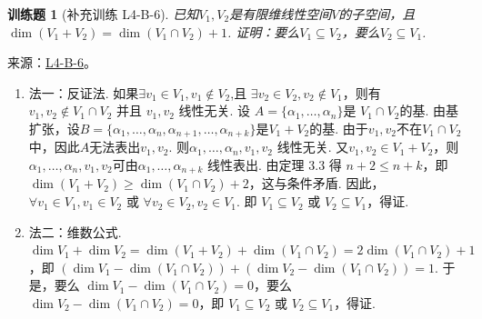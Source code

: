 \documentclass[12pt,fontset=fandol]{ctexart}
\newtheorem{exercise}{训练题}[section]
\begin{document}
\begin{exercise}[补充训练 L4-B-6]\label{prob:L4-B-6}
已知$V_1,V_2$是有限维线性空间$V$的子空间，且$\dim(V_1+V_2)=\dim(V_1 \cap V_2)+1$. 证明：要么$V_1 \subseteq V_2$，要么$V_2 \subseteq V_1$.
\end{exercise}
\noindent 来源：\href{https://github.com/yhwu-is/Linear-Algebra-Left-Undone/blob/new/%E8%AE%B2%E4%B9%89/%E4%B8%93%E9%A2%98/4%20%E7%BA%BF%E6%80%A7%E7%A9%BA%E9%97%B4%E7%9A%84%E8%BF%90%E7%AE%97.tex}{L4-B-6}。
\begin{solve}
\begin{enumerate}
                \item 法一：反证法. 如果$\exists v_1\in V_1,v_1\not\in V_2$,且 $\exists v_2\in V_2,v_2\not\in V_1$，则有 $v_1,v_2\not \in V_1\cap V_2$ 并且 $v_1,v_2$ 线性无关. 设 $A=\{\alpha_1,\ldots ,\alpha_n\}$是 $V_1\cap V_2$的基. 由基扩张，设$B=\{\alpha_1,\ldots ,\alpha_n,\alpha_{n+1},\ldots ,\alpha_{n+k}\}$是$V_1+V_2$的基. 由于$v_1,v_2$不在$V_1\cap V_2$中，因此$A$无法表出$v_1,v_2$. 则$\alpha_1,\ldots ,\alpha_n,v_1,v_2$ 线性无关. 又$v_1,v_2\in V_1+V_2$，则$\alpha_1,\ldots ,\alpha_n,v_1,v_2$可由$\alpha_1,\ldots ,\alpha_{n+k}$ 线性表出. 由定理 $3.3$ 得 $n+2\leqslant n+k$，即 $\dim (V_1+V_2)\ge\dim (V_1\cap V_2)+2$，这与条件矛盾. 因此，$\forall v_1\in V_1,v_1\in V_2$ 或 $\forall v_2\in V_2,v_2\in V_1$. 即 $V_1\subseteq V_2$ 或 $V_2\subseteq V_1$，得证.

                \item 法二：维数公式. $\dim V_1+\dim V_2=\dim  (V_1+V_2)+\dim  (V_1\cap V_2)=2\dim  (V_1\cap V_2)+1$，即 $(\dim V_1-\dim  (V_1\cap V_2))+ (\dim V_2-\dim  (V_1\cap V_2))=1$. 于是，要么 $\dim V_1-\dim  (V_1\cap V_2)=0$，要么 $\dim V_2-\dim  (V_1\cap V_2)=0$，即 $V_1\subseteq V_2$ 或 $V_2\subseteq V_1$，得证.
            \end{enumerate}
\end{solve}
\end{document}
